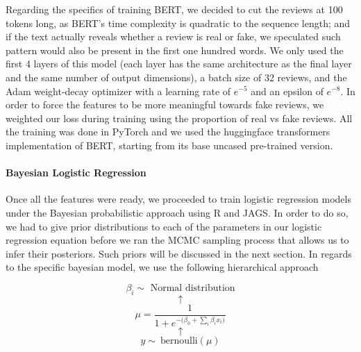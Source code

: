 \documentclass[man, floatsintext, 10pt]{apa6}
\begin{document}
Regarding the specifics of training BERT, we decided to cut the reviews at 100 tokens long, as BERT's time complexity is quadratic to the sequence length; and if the text actually reveals whether a review is real or fake, we speculated such pattern would also be present in the first one hundred words. We only used the first 4 layers of this model (each layer has the same architecture as the final layer and the same number of output dimensions), a batch size of 32 reviews, and the Adam weight-decay optimizer with a learning rate of $e^{-5}$ and an epsilon of $e^{-8}$. In order to force the features to be more meaningful towards fake reviews, we weighted our loss during training using the proportion of real vs fake reviews. All the training was done in PyTorch and we used the huggingface transformers implementation of BERT, starting from its base uncased pre-trained version.

\vspace{2mm}

\paragraph{Bayesian Logistic Regression} Once all the features were ready, we proceeded to train logistic regression models under the Bayesian probabilistic approach using R and JAGS. In order to do so, we had to give prior distributions to each of the parameters in our logistic regression equation before we ran the MCMC sampling process that allows us to infer their posteriors. Such priors will be discussed in the next section. In regards to the specific bayesian model, we use the following hierarchical approach 

\[\beta_i \sim \text{ Normal distribution} \] \[ \uparrow \] 
\begin{equation} 
\label{Bern} 
 \mu = \frac{1}{1 + e^{-\big(\beta_0 + \sum_i \beta_i x_i \big)}} 
 \end{equation}
\vspace{0.01mm}  \[ \uparrow \] \[ y \sim\ \text{bernoulli} (\mu) \]
\end{document}

